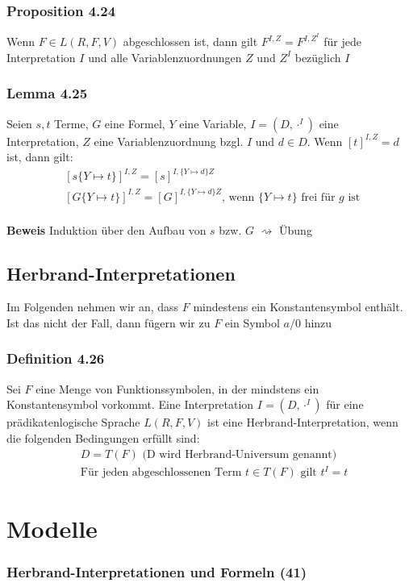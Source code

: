 \subsubsection{Proposition 4.24}
Wenn \(F\in L(R,F,V)\) abgeschlossen ist, dann gilt \(F^{I,Z} = F^{I,Z^I}\) für jede Interpretation \(I\) und alle Variablenzuordnungen \(Z\) und \(Z^I\) bezüglich \(I\)
\subsubsection{Lemma 4.25}
Seien \(s,t\) Terme, \(G\) eine Formel, \(Y\) eine Variable, \(I=(D,\cdot ^I)\) eine Interpretation, \(Z\) eine Variablenzuordnung bzgl. \(I\) und \(d\in D\). Wenn \([t]^{I,Z}= d\) ist, dann gilt:
\begin{align*}
&[s\{Y\mapsto t\}]^{I,Z}=[s]^{I,\{Y\mapsto d\} Z} \\
&[G\{Y\mapsto t\}]^{I,Z}=[G]^{I,\{Y\mapsto d\} Z}\text{, wenn } \{Y\mapsto t\} \text{ frei für } g \text{ ist }
\end{align*}
\\\textbf{Beweis} Induktion über den Aufbau von \(s\) bzw. \(G\) \(\rightsquigarrow\) Übung
\subsection{Herbrand-Interpretationen}
Im Folgenden nehmen wir an, dass \(F\) mindestens ein Konstantensymbol enthält. Ist das nicht der Fall, dann fügern wir zu \(F\) ein Symbol \(a/0\) hinzu
\subsubsection{Definition 4.26}
Sei \(F\) eine Menge von Funktionssymbolen, in der mindstens ein Konstantensymbol vorkommt. Eine Interpretation \(I=(D,\cdot ^I)\) für eine prädikatenlogische Sprache \(L(R,F,V)\) ist eine Herbrand-Interpretation, wenn die folgenden Bedingungen erfüllt sind:
\begin{align*}
	&D = T(F) \text{ (D wird Herbrand-Universum genannt})\\
	&\text{Für jeden abgeschlossenen Term } t\in T(F) \text{ gilt } t^I = t
\end{align*}
\section{Modelle}
\subsubsection{Herbrand-Interpretationen und Formeln (41)}
